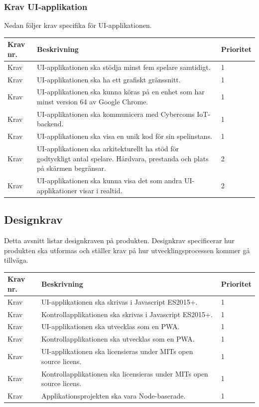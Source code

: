 \documentclass[10pt]{article}
\newcounter{indexcounter}
\newcommand{\Krav}[2]{
	\stepcounter{indexcounter}
	Krav \arabic{indexcounter} & #1 & #2 \\ \hline
}
\begin{document}
	\pagebreak
	\subsubsection*{Krav UI-applikation}
	Nedan följer krav specifika för UI-applikationen.\\

	\begin{tabular}{| p{2cm} | p{8cm} | p{2cm}|}
		\hline
		
		\textbf{Krav nr.} & \textbf{Beskrivning} &\textbf{Prioritet} \\ \hline
		\Krav{UI-applikationen ska stödja minst fem spelare samtidigt.}{1}
		\Krav{UI-applikationen ska ha ett grafiskt gränssnitt.}{1}
		\Krav{UI-applikationen ska kunna köras på en enhet som har minst version 64 av Google Chrome.}{1}
		\Krav{UI-applikationen ska kommunicera med Cybercoms IoT-backend.}{1}
		\Krav{UI-applikationen ska visa en unik kod för sin spelinstans.}{1}
		\Krav{UI-applikationen ska arkitekturellt ha stöd för godtyckligt antal spelare. Hårdvara, prestanda och plats på skärmen begränsar.}{2}
		\Krav{UI-applikationen ska kunna visa det som andra UI-applikationer visar i realtid.}{2}
						
	\end{tabular}
	
	\subsection{Designkrav}
	Detta avsnitt listar designkraven på produkten. Designkrav specificerar hur produkten ska utformas och ställer krav på hur utvecklingsprocessen kommer gå tillväga.  \\
	
	\begin{tabular}{| p{2cm} | p{8cm} | p{2cm}|}
		\hline
		\textbf{Krav nr.} & \textbf{Beskrivning} & \textbf{Prioritet} \\ \hline
		
		\Krav{UI-applikationen ska skrivas i Javascript ES2015+.}{1}
		\Krav{Kontrollapplikationen ska skrivas i Javascript ES2015+.}{1}
		\Krav{UI-applikationen ska utvecklas som en PWA.}{1}
		\Krav{Kontrollapplikationen ska utvecklas som en PWA.}{1}
		\Krav{UI-applikationen ska licensieras under MITs open source licens.}{1}
		\Krav{Kontrollapplikationen ska licensieras under MITs open source licens.}{1}
		\Krav{Applikationsprojekten ska vara Node-baserade.}{1}
		
	\end{tabular}
\pagebreak
\end{document}
